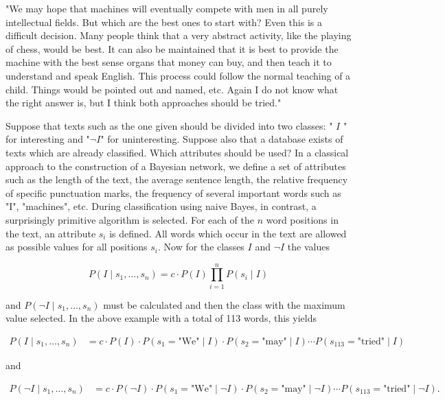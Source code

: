 \documentclass[10pt]{book}
\begin{document}
\begin{displayquote}
"We may hope that machines will eventually compete with men in all purely intellectual fields. But which are the best ones to start with? Even this is a difficult decision. Many people think that a very abstract activity, like the playing of chess, would be best. It can also be maintained that it is best to provide the machine with the best sense organs that money can buy, and then teach it to understand and speak English. This process could follow the normal teaching of a child. Things would be pointed out and named, etc. Again I do not know what the right answer is, but I think both approaches should be tried."
\end{displayquote}

Suppose that texts such as the one given should be divided into two classes: " $I$ " for interesting and "$\neg I$" for uninteresting. Suppose also that a database exists of texts which are already classified. Which attributes should be used? In a classical approach to the construction of a Bayesian network, we define a set of attributes such as the length of the text, the average sentence length, the relative frequency of specific punctuation marks, the frequency of several important words such as "I", "machines", etc. During classification using naive Bayes, in contrast, a surprisingly primitive algorithm is selected. For each of the $n$ word positions in the text, an attribute $s_{i}$ is defined. All words which occur in the text are allowed as possible values for all positions $s_{i}$. Now for the classes $I$ and $\neg I$ the values

\begin{equation*}
P\left(I \mid s_{1}, \ldots, s_{n}\right)=c \cdot P(I) \prod_{i=1}^{n} P\left(s_{i} \mid I\right) \tag{8.9}
\end{equation*}

and $P\left(\neg I \mid s_{1}, \ldots, s_{n}\right)$ must be calculated and then the class with the maximum value selected. In the above example with a total of 113 words, this yields

\[
\begin{aligned}
P\left(I \mid s_{1}, \ldots, s_{n}\right)
&= c \cdot P(I) \cdot P\!\left(s_{1}=\text{"We"} \mid I\right) \cdot P\!\left(s_{2}=\text{"may"} \mid I\right) \cdots P\!\left(s_{113}=\text{"tried"} \mid I\right)
\end{aligned}
\]

and

\[
\begin{aligned}
P\left(\neg I \mid s_{1}, \ldots, s_{n}\right)
&= c \cdot P(\neg I) \cdot P\!\left(s_{1}=\text{"We"} \mid \neg I\right) \cdot P\!\left(s_{2}=\text{"may"} \mid \neg I\right) \cdots P\!\left(s_{113}=\text{"tried"} \mid \neg I\right).
\end{aligned}
\]
\end{document}
